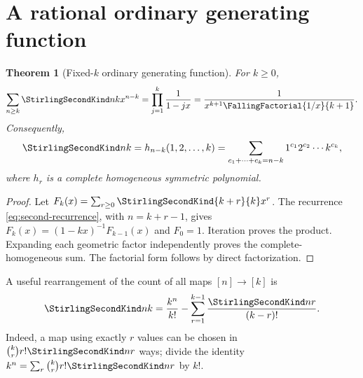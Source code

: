 \documentclass[11pt,a4paper,oneside,openany]{book}
\newtheorem{theorem}{Theorem}[chapter]
\theoremstyle{definition}
\theoremstyle{remark}
\begin{document}
\section{A rational ordinary generating function}
\begin{theorem}[Fixed-$k$ ordinary generating function]\label{thm:second-ogf}
For $k\ge0$,
\begin{equation}\label{eq:second-ogf}
 \sum_{n\ge k}\StirlingSecondKind nk x^{n-k}
 =\prod_{j=1}^k\frac1{1-jx}
 =\frac1{x^{k+1}\FallingFactorial{1/x}{k+1}}.
\end{equation}
Consequently,
\begin{equation}\label{eq:second-complete-symmetric}
 \StirlingSecondKind nk=h_{n-k}(1,2,\ldots,k)
 =\sum_{c_1+\cdots+c_k=n-k}1^{c_1}2^{c_2}\cdots k^{c_k},
\end{equation}
where $h_r$ is a complete homogeneous symmetric polynomial.
\end{theorem}
\begin{proof}
Let $F_k(x)=\sum_{r\ge0}\StirlingSecondKind{k+r}{k}x^r$.  The recurrence
\cref{eq:second-recurrence}, with $n=k+r-1$, gives
$F_k(x)=(1-kx)^{-1}F_{k-1}(x)$ and $F_0=1$.  Iteration proves the product.
Expanding each geometric factor independently proves the complete-homogeneous sum.
The factorial form follows by direct factorization.
\end{proof}

A useful rearrangement of the count of all maps $[n]\to[k]$ is
\begin{equation}\label{eq:second-alternate-rec}
 \StirlingSecondKind nk=\frac{k^n}{k!}-\sum_{r=1}^{k-1}\frac{\StirlingSecondKind nr}{(k-r)!}.
\end{equation}
Indeed, a map using exactly $r$ values can be chosen in
$\binom kr r!\StirlingSecondKind nr$ ways; divide the identity
$k^n=\sum_r\binom kr r!\StirlingSecondKind nr$ by $k!$.
\end{document}
